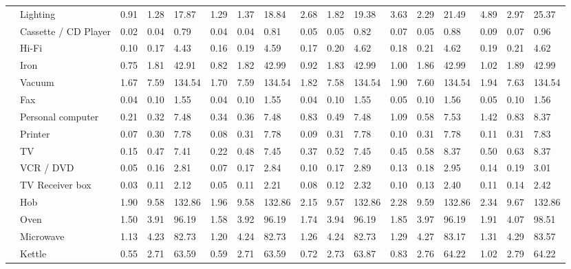 \documentclass[11pt,a4paper]{article}
\theoremstyle{plain}
\theoremstyle{plain}
\theoremstyle{plain}
\theoremstyle{plain}
\theoremstyle{nonumberplain} \theoremseparator{}
\begin{document}
\begin{landscape}
\begin{table*}
\begin{tabular}{|c|l|l|l|l|l|l|l|l|l|l|l|l|l|l|l|l|}
& Lighting & 0.91 & 1.28 & 17.87 & 1.29 & 1.37 & 18.84 & 2.68 & 1.82 & 19.38 & 3.63 & 2.29 & 21.49 & 4.89 & 2.97 & 25.37\\ 
 \cline{2-17}
&  Cassette / CD Player & 0.02 & 0.04 & 0.79 & 0.04 & 0.04 & 0.81 & 0.05 & 0.05 & 0.82 & 0.07 & 0.05 & 0.88 & 0.09 & 0.07 & 0.96\\ 
\cline{2-17}
&  Hi-Fi & 0.10 & 0.17 & 4.43 & 0.16 & 0.19 & 4.59 & 0.17 & 0.20 & 4.62 & 0.18 & 0.21 & 4.62 & 0.19 & 0.21 & 4.62\\ 
\cline{2-17}
&  Iron  &0.75 & 1.81 & 42.91 & 0.82 & 1.82 & 42.99 & 0.92 & 1.83 & 42.99 & 1.00 & 1.86 & 42.99 & 1.02 & 1.89 & 42.99\\ 
\cline{2-17}
&  Vacuum &1.67 & 7.59 & 134.54 & 1.70 & 7.59 & 134.54 & 1.82 & 7.58 & 134.54 & 1.90 & 7.60 & 134.54 & 1.94 & 7.63 & 134.54\\ 
\cline{2-17}
&  Fax &0.04 & 0.10 & 1.55 & 0.04 & 0.10 & 1.55 & 0.04 & 0.10 & 1.55 & 0.05 & 0.10 & 1.56 & 0.05 & 0.10 & 1.56\\ 
\cline{2-17}
&  Personal computer &0.21 & 0.32 & 7.48 & 0.34 & 0.36 & 7.48 & 0.83 & 0.49 & 7.48 & 1.09 & 0.58 & 7.53 & 1.42 & 0.83 & 8.37\\ 
\cline{2-17}
&  Printer &0.07 & 0.30 & 7.78 & 0.08 & 0.31 & 7.78 & 0.09 & 0.31 & 7.78 & 0.10 & 0.31 & 7.78 & 0.11 & 0.31 & 7.83\\ 
\cline{2-17}
&  TV& 0.15 & 0.47 & 7.41 & 0.22 & 0.48 & 7.45 & 0.37 & 0.52 & 7.45 & 0.45 & 0.58 & 8.37 & 0.50 & 0.63 & 8.37\\ 
\cline{2-17}
&  VCR / DVD & 0.05 & 0.16 & 2.81 & 0.07 & 0.17 & 2.84 & 0.10 & 0.17 & 2.89 & 0.13 & 0.18 & 2.95 & 0.14 & 0.19 & 3.01\\ 
\cline{2-17}
&  TV Receiver box &0.03 & 0.11 & 2.12 & 0.05 & 0.11 & 2.21 & 0.08 & 0.12 & 2.32 & 0.10 & 0.13 & 2.40 & 0.11 & 0.14 & 2.42\\ 
\cline{2-17}
&  Hob &1.90 & 9.58 & 132.86 & 1.96 & 9.58 & 132.86 & 2.15 & 9.57 & 132.86 & 2.28 & 9.59 & 132.86 & 2.34 & 9.67 & 132.86\\ 
\cline{2-17}
&  Oven &1.50 & 3.91 & 96.19 & 1.58 & 3.92 & 96.19 & 1.74 & 3.94 & 96.19 & 1.85 & 3.97 & 96.19 & 1.91 & 4.07 & 98.51\\ 
\cline{2-17}
&  Microwave &1.13 & 4.23 & 82.73 & 1.20 & 4.24 & 82.73 & 1.26 & 4.24 & 82.73 & 1.29 & 4.27 & 83.17 & 1.31 & 4.29 & 83.57\\ 
\cline{2-17}
&  Kettle &0.55 & 2.71 & 63.59 & 0.59 & 2.71 & 63.59 & 0.72 & 2.73 & 63.87 & 0.83 & 2.76 & 64.22 & 1.02 & 2.79 & 64.22\\ 

\end{tabular}
\end{table*}
\end{landscape}
\end{document}
